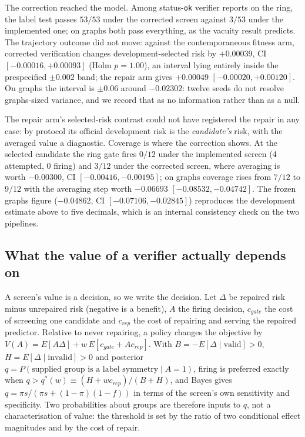 \documentclass[11pt]{article}
\begin{document}
The correction reached the model. Among status-\texttt{ok} verifier reports on the ring, the label
test passes $53/53$ under the corrected screen against $3/53$ under the implemented one; on graphs
both pass everything, as the vacuity result predicts. The trajectory outcome did not move: against
the contemporaneous fitness arm, corrected verification changes development-selected risk by
$+0.00039$, CI $[-0.00016,+0.00093]$ (Holm $p{=}1.00$), an interval lying entirely inside the
prespecified $\pm0.002$ band; the repair arm gives $+0.00049$
$[-0.00020,+0.00120]$. On graphs the interval is $\pm0.06$ around $-0.02302$: twelve seeds do not
resolve graphs-sized variance, and we record that as no information rather than as a null.

The repair arm's selected-risk contrast could not have registered the repair in any case: by
protocol its official development risk is the \emph{candidate's} risk, with the averaged value a
diagnostic. Coverage is where the correction shows. At the selected candidate the ring gate fires
$0/12$ under the implemented screen (4 attempted, 0 firing) and $3/12$ under the corrected screen,
where averaging is worth $-0.00300$, CI $[-0.00416,-0.00195]$; on graphs coverage rises from $7/12$
to $9/12$ with the averaging step worth $-0.06693$ $[-0.08532,-0.04742]$. The frozen graphs figure
($-0.04862$, CI $[-0.07106,-0.02845]$) reproduces the development estimate above to five decimals,
which is an internal consistency check on the two pipelines.

\subsection{What the value of a verifier actually depends on}
\label{sec:decisionmodel}

A screen's value is a decision, so we write the decision. Let $\Delta$ be repaired risk minus
unrepaired risk (negative is a benefit), $A$ the firing decision, $c_{gate}$ the cost of screening
one candidate and $c_{rep}$ the cost of repairing and serving the repaired predictor. Relative to
never repairing, a policy changes the objective by $V(A) = E[A\Delta] + w\,E[c_{gate} + A c_{rep}]$.
With $B = -E[\Delta \mid \text{valid}] > 0$, $H = E[\Delta \mid \text{invalid}] > 0$ and posterior
$q = P(\text{supplied group is a label symmetry} \mid A = 1)$, firing is preferred exactly when
$q > q^*(w) \equiv (H + w c_{rep})/(B + H)$, and Bayes gives $q = \pi s / (\pi s + (1-\pi)(1-f))$
in terms of the screen's own sensitivity and specificity. Two probabilities about groups are
therefore inputs to $q$, not a characterisation of value: the threshold is set by the ratio of two
conditional effect magnitudes and by the cost of repair.
\end{document}
